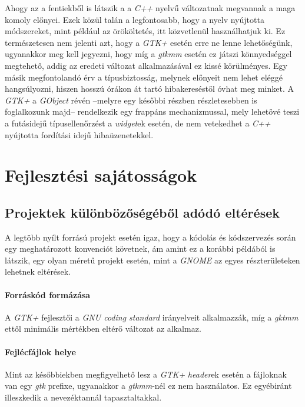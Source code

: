 Ahogy az a fentiekből is látszik a a \textit{C++} nyelvű változatnak megvannak a maga komoly előnyei. Ezek közül talán a legfontosabb, hogy a nyelv nyújtotta módszereket, mint például az örököltetés, itt közvetlenül használhatjuk ki. Ez természetesen nem jelenti azt, hogy a \textit{GTK+} esetén erre ne lenne lehetőségünk, ugyanakkor meg kell jegyezni, hogy míg a \textit{gtkmm} esetén ez játszi könnyedséggel megtehető, addig az eredeti változat alkalmazásával ez kissé körülményes. Egy másik megfontolandó érv a típusbiztosság, melynek előnyeit nem lehet eléggé hangsúlyozni, hiszen hosszú órákon át tartó hibakereséstől óvhat meg minket. A \textit{GTK+} a \textit{GObject} révén --melyre egy későbbi részben részletesebben is foglalkozunk majd-- rendelkezik egy frappáns mechanizmussal, mely lehetővé teszi a futásidejű típusellenőrzést a \textit{widget}ek esetén, de nem vetekedhet a \textit{C++} nyújtotta fordítási idejű hibaüzenetekkel.

\section{Fejlesztési sajátosságok}

\subsection{Projektek különbözőségéből adódó eltérések}

A legtöbb nyílt forrású projekt esetén igaz, hogy a kódolás és kódszervezés során egy meghatározott konvenciót követnek, ám amint ez a korábbi példából is látszik, egy olyan méretű projekt esetén, mint a \textit{GNOME} az egyes részterületeken lehetnek eltérések.

\paragraph{Forráskód formázása}

A \textit{GTK+} fejlesztői a \textit{GNU coding standard} irányelveit alkalmazzák, míg a \textit{gktmm} ettől minimális mértékben eltérő változat az alkalmaz.

\paragraph{Fejlécfájlok helye}

Mint az későbbiekben megfigyelhető lesz a \textit{GTK+} \textit{header}ek esetén a fájloknak van egy \textit{gtk} prefixe, ugyanakkor a \textit{gtkmm}-nél ez nem használatos. Ez egyébiránt illeszkedik a nevezéktannál tapasztaltakkal.

